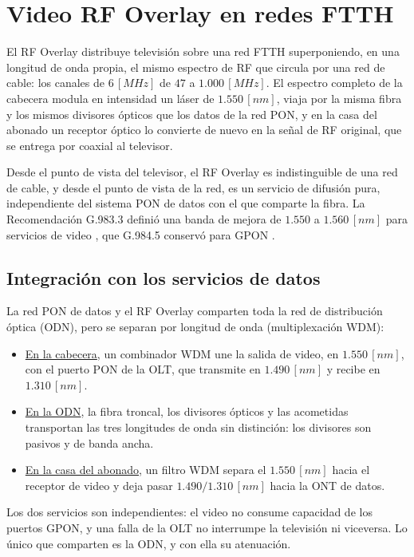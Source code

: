 \section{Video RF Overlay en redes FTTH}
\label{sec:rf_overlay}

El RF Overlay distribuye televisión sobre una red FTTH superponiendo, en una longitud de onda propia, el mismo espectro de RF que circula por una red de cable: los canales de $6 \, [MHz]$ de $47$ a $1.000 \, [MHz]$. El espectro completo de la cabecera modula en intensidad un láser de $1.550 \, [nm]$, viaja por la misma fibra y los mismos divisores ópticos que los datos de la red PON, y en la casa del abonado un receptor óptico lo convierte de nuevo en la señal de RF original, que se entrega por coaxial al televisor.

Desde el punto de vista del televisor, el RF Overlay es indistinguible de una red de cable, y desde el punto de vista de la red, es un servicio de difusión pura, independiente del sistema PON de datos con el que comparte la fibra. La Recomendación G.983.3 definió una banda de mejora de $1.550$ a $1.560 \, [nm]$ para servicios de video \cite{itu_g9833}, que G.984.5 conservó para GPON \cite{itu_g9845}.

\subsection{Integración con los servicios de datos}
La red PON de datos y el RF Overlay comparten toda la red de distribución óptica (ODN), pero se separan por longitud de onda (multiplexación WDM):
\begin{itemize}
    \item \underline{En la cabecera}, un combinador WDM une la salida de video, en $1.550 \, [nm]$, con el puerto PON de la OLT, que transmite en $1.490 \, [nm]$ y recibe en $1.310 \, [nm]$.
    \item \underline{En la ODN}, la fibra troncal, los divisores ópticos y las acometidas transportan las tres longitudes de onda sin distinción: los divisores son pasivos y de banda ancha.
    \item \underline{En la casa del abonado}, un filtro WDM separa el $1.550 \, [nm]$ hacia el receptor de video y deja pasar $1.490/1.310 \, [nm]$ hacia la ONT de datos.
\end{itemize}
Los dos servicios son independientes: el video no consume capacidad de los puertos GPON, y una falla de la OLT no interrumpe la televisión ni viceversa. Lo único que comparten es la ODN, y con ella su atenuación.

